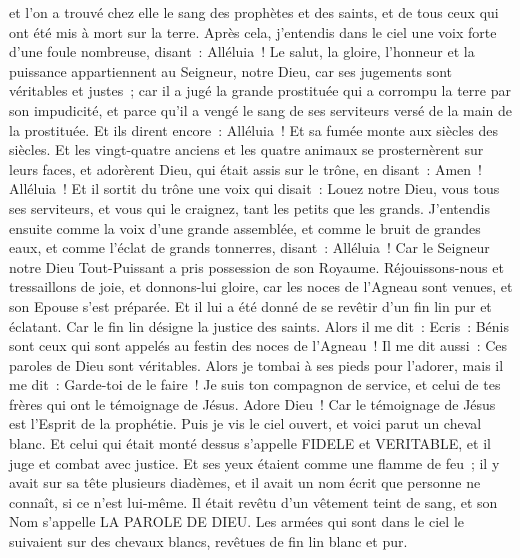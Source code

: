 \begin{multicols}{2}
et l'on a trouvé chez elle le sang des prophètes et des saints, et de tous ceux qui ont été mis à mort sur la terre.
\VerseOne{}Après cela, j'entendis dans le ciel une voix forte d'une foule nombreuse, disant~: Alléluia~! Le salut, la gloire, l'honneur et la puissance appartiennent au Seigneur, notre Dieu,
car ses jugements sont véritables et justes~; car il a jugé la grande prostituée qui a corrompu la terre par son impudicité, et parce qu'il a vengé le sang de ses serviteurs versé de la main de la prostituée.
Et ils dirent encore~: Alléluia~! Et sa fumée monte aux siècles des siècles.
Et les vingt-quatre anciens et les quatre animaux se prosternèrent sur leurs faces, et adorèrent Dieu, qui était assis sur le trône, en disant~: Amen~! Alléluia~!
Et il sortit du trône une voix qui disait~: Louez notre Dieu, vous tous ses serviteurs, et vous qui le craignez, tant les petits que les grands.
J'entendis ensuite comme la voix d'une grande assemblée, et comme le bruit de grandes eaux, et comme l'éclat de grands tonnerres, disant~: Alléluia~! Car le Seigneur notre Dieu Tout-Puissant a pris possession de son Royaume.
Réjouissons-nous et tressaillons de joie, et donnons-lui gloire, car les noces de l'Agneau sont venues, et son Epouse s'est préparée.
Et il lui a été donné de se revêtir d'un fin lin pur et éclatant. Car le fin lin désigne la justice des saints.
Alors il me dit~: Ecris~: Bénis sont ceux qui sont appelés au festin des noces de l'Agneau~! Il me dit aussi~: Ces paroles de Dieu sont véritables.
Alors je tombai à ses pieds pour l'adorer, mais il me dit~: Garde-toi de le faire~! Je suis ton compagnon de service, et celui de tes frères qui ont le témoignage de Jésus. Adore Dieu~! Car le témoignage de Jésus est l'Esprit de la prophétie.
Puis je vis le ciel ouvert, et voici parut un cheval blanc. Et celui qui était monté dessus s'appelle FIDELE et VERITABLE, et il juge et combat avec justice.
Et ses yeux étaient comme une flamme de feu~; il y avait sur sa tête plusieurs diadèmes, et il avait un nom écrit que personne ne connaît, si ce n'est lui-même.
Il était revêtu d'un vêtement teint de sang, et son Nom s'appelle LA PAROLE DE DIEU.
Les armées qui sont dans le ciel le suivaient sur des chevaux blancs, revêtues de fin lin blanc et pur.

\end{multicols}
